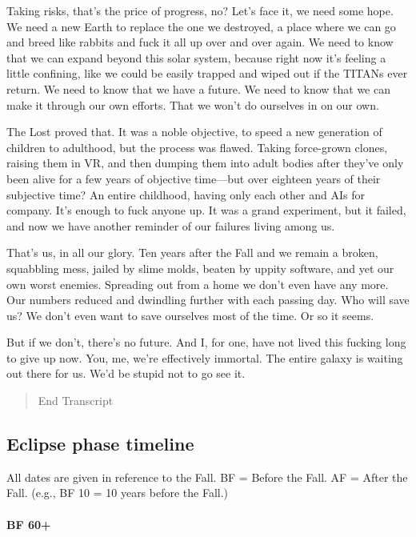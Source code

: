 Taking risks, that's the price of progress, no? Let's face it, we need some hope. We need a new Earth to replace the one we destroyed, a place where we can go and breed like rabbits and fuck it all up over and over again. We need to know that we can expand beyond this solar system, because right now it's feeling a little confining, like we could be easily trapped and wiped out if the TITANs ever return. We need to know that we have a future. We need to know that we can make it through our own efforts. That we won't do ourselves in on our own. 

The Lost proved that. It was a noble objective, to speed a new generation of children to adulthood, but the process was flawed. Taking force-grown clones, raising them in VR, and then dumping them into adult bodies after they've only been alive for a few years of objective time—but over eighteen years of their subjective time? An entire childhood, having only each other and AIs for company. It's enough to fuck anyone up. It was a grand experiment, but it failed, and now we have another reminder of our failures living among us. 

That's us, in all our glory. Ten years after the Fall and we remain a broken, squabbling mess, jailed by slime molds, beaten by uppity software, and yet our own worst enemies. Spreading out from a home we don't even have any more. Our numbers reduced and dwindling further with each passing day. Who will save us? We don't even want to save ourselves most of the time. Or so it seems. 

But if we don't, there's no future. And I, for one, have not lived this fucking long to give up now. You, me, we're effectively immortal. The entire galaxy is waiting out there for us. We'd be stupid not to go see it. 

\begin{quotation}
End Transcript
\end{quotation} 

\subsection{Eclipse phase timeline}
\label{sec:eclipse-phase-timel} 

All dates are given in reference to the Fall. BF = Before the Fall. AF = After the Fall. (e.g., BF 10 = 10 years before the Fall.)  \paragraph{ BF 60+} 

